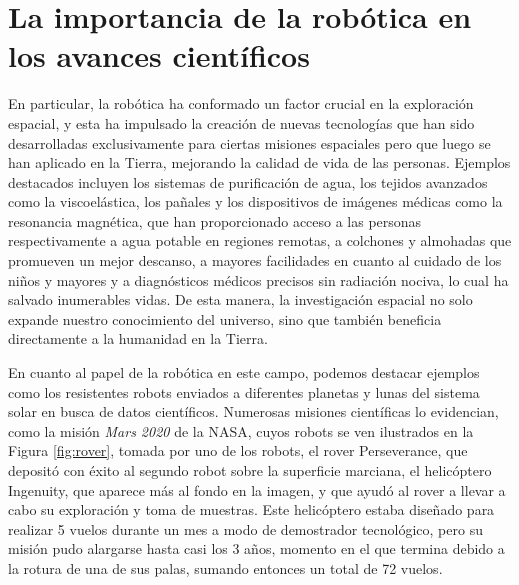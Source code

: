 


\section{La importancia de la robótica en los avances científicos}
\label{sec:exploracion_espacial} %

En particular, la robótica ha conformado un factor crucial en la exploración
espacial, y esta ha impulsado la creación de nuevas tecnologías que han sido
desarrolladas exclusivamente para ciertas misiones espaciales pero que luego se
han aplicado en la Tierra, mejorando la calidad de vida de las personas.
Ejemplos destacados incluyen los sistemas de purificación de agua, los tejidos
avanzados como la viscoelástica, los pañales y los dispositivos de imágenes
médicas como la resonancia magnética, que han proporcionado acceso a las
personas respectivamente a agua potable en regiones remotas, a colchones y
almohadas que promueven un mejor descanso, a mayores facilidades en cuanto al
cuidado de los niños y mayores y a diagnósticos médicos precisos sin radiación
nociva, lo cual ha salvado inumerables vidas.
De esta manera, la investigación espacial no solo expande nuestro conocimiento
del universo, sino que también beneficia directamente a la humanidad en la
Tierra.

En cuanto al papel de la robótica en este campo, podemos destacar ejemplos como
los resistentes robots enviados a diferentes planetas y lunas del sistema solar
en busca de datos científicos.
Numerosas misiones científicas lo evidencian, como la misión \textit{Mars 2020}
de la NASA, cuyos robots se ven ilustrados en la Figura \ref{fig:rover}, tomada
por uno de los robots, el rover Perseverance, que depositó con éxito al segundo
robot sobre la superficie marciana, el helicóptero Ingenuity, que aparece más al
fondo en la imagen, y que ayudó al rover a llevar a cabo su exploración y toma
de muestras.
Este helicóptero estaba diseñado para realizar 5 vuelos durante un mes a modo de
demostrador tecnológico, pero su misión pudo alargarse hasta casi los 3 años,
momento en el que termina debido a la rotura de una de sus palas, sumando
entonces un total de 72 vuelos.

